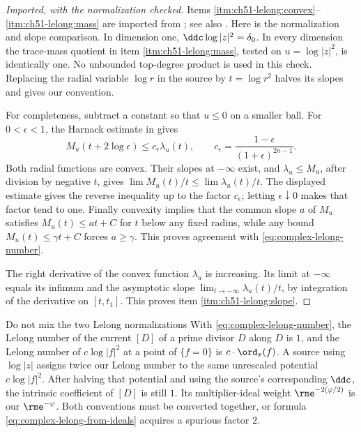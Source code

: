 \begin{proof}[Imported, with the normalization checked]
Items \cref{itm:ch51-lelong:convex}--\cref{itm:ch51-lelong:mass}
are imported from \cite[Chapter~III, \S6, Corollary~6.8 and
Example~6.9]{DemBook}; see also \cite{Lel68,Siu74,Dem93}.
Here is the normalization and slope comparison.  In dimension one,
$\ddc\log|z|^2=\delta_0$.  In every dimension the trace-mass quotient
in item \cref{itm:ch51-lelong:mass}, tested on $u=\log|z|^2$, is
identically one.  No unbounded top-degree product is used in this check.
Replacing the radial variable $\log r$ in the source by $t=\log r^2$
halves its slopes and gives our convention.

For completeness, subtract a constant so that $u\leq0$ on a smaller
ball.  For $0<\epsilon<1$, the Harnack estimate in
\cite[Chapter~III, Example~6.9]{DemBook} gives
\[
 M_u(t+2\log\epsilon)\leq c_\epsilon\lambda_u(t),
 \qquad c_\epsilon=\frac{1-\epsilon}{(1+\epsilon)^{2n-1}}.
\]
Both radial functions are convex.  Their slopes at $-\infty$ exist, and
$\lambda_u\leq M_u$, after division by negative $t$, gives
$\lim M_u(t)/t\leq\lim\lambda_u(t)/t$.  The displayed estimate gives
the reverse inequality up to the factor $c_\epsilon$; letting
$\epsilon\downarrow0$ makes that factor tend to one.  Finally convexity
implies that the common slope $a$ of $M_u$ satisfies
$M_u(t)\leq at+C$ for $t$ below any fixed radius, while any bound
$M_u(t)\leq\gamma t+C$ forces $a\geq\gamma$.  This proves agreement
with \eqref{eq:complex-lelong-number}.

The right derivative of the convex function $\lambda_u$ is increasing.
Its limit at $-\infty$ equals its infimum and the asymptotic slope
$\lim_{t\to-\infty}\lambda_u(t)/t$, by integration of the derivative
on $[t,t_1]$.  This proves item \cref{itm:ch51-lelong:slope}.
\end{proof}

\begin{warning}{Do not mix the two Lelong normalizations}
\label{warn:ch51-lelong-normalization}
With \eqref{eq:complex-lelong-number}, the Lelong number of the current
$[D]$ of a prime divisor $D$ along $D$ is $1$, and the Lelong
number of $c\log|f|^2$ at a point of $\{f=0\}$ is
$c\cdot\ord_x(f)$.  A source using $\log|z|$ assigns twice our
Lelong number to the same unrescaled potential $c\log|f|^2$.  After
halving that potential and using the source's corresponding $\ddc$,
the intrinsic coefficient of $[D]$ is still $1$.  Its multiplier-ideal
weight $\rme^{-2(\varphi/2)}$ is our $\rme^{-\varphi}$.
Both conventions must be converted together, or formula
\eqref{eq:complex-lelong-from-ideals} acquires a spurious factor $2$.
\end{warning}

